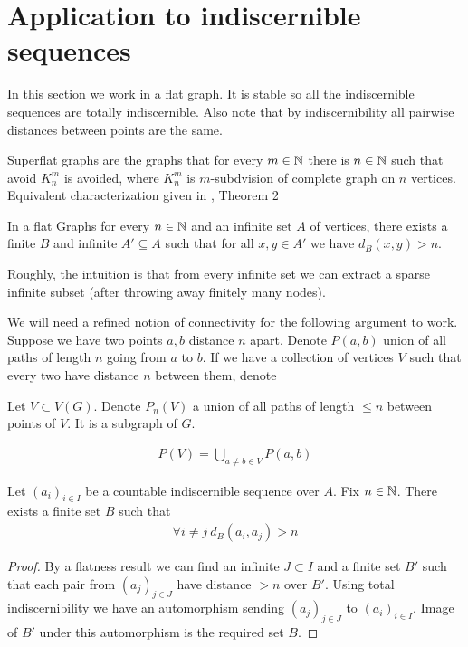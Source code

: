 \documentclass{amsart}
\begin{document}
\section{Application to indiscernible sequences}

In this section we work in a flat graph. It is stable so all the indiscernible sequences are totally indiscernible. Also note that by indiscernibility all pairwise distances between points are the same.

Superflat graphs are the graphs that for every $m \in \mathbb{N}$ there is $n \in \mathbb{N}$ such that avoid $K^m_n$ is avoided, where $K^m_n$ is $m$-subdvision of complete graph on $n$ vertices. Equivalent characterization given in , Theorem 2

\begin{Theorem}
	In a flat Graphs for every $n \in \mathbb{N}$ and an infinite set $A$ of vertices, there exists a finite $B$ and infinite $A' \subseteq A$ such that for all $x,y \in A'$ we have $d_{B}(x, y) > n$.
\end{Theorem}

Roughly, the intuition is that from every infinite set we can extract a sparse infinite subset (after throwing away finitely many nodes).

We will need a refined notion of connectivity for the following argument to work. Suppose we have two points $a,b$ distance $n$ apart. Denote $P(a,b)$ union of all paths of length $n$ going from $a$ to $b$. If we have a collection of vertices $V$ such that every two have distance $n$ between them, denote

Let $V \subset V(G)$. Denote $P_n(V)$ a union of all paths of length $\leq n$ between points of $V$. It is a subgraph of $G$.

\begin{align*}
	P(V) = \bigcup_{a \neq b \in V} P(a,b)
\end{align*}

\begin{Lemma}
	Let $(a_i)_{i \in I}$ be a countable indiscernible sequence over $A$. Fix $n \in \mathbb{N}$. There exists a finite set $B$ such that
	\begin{align*}
		\forall i \neq j \ d_B(a_i, a_j) > n
	\end{align*}
\end{Lemma}

\begin{proof}
	By a flatness result we can find an infinite $J \subset I$ and a finite set $B'$ such that each pair from $(a_j)_{j \in J}$ have distance $>n$ over $B'$. Using total indiscernibility we have an automorphism sending $(a_j)_{j \in J}$ to $(a_i)_{i \in I}$. Image of $B'$ under this automorphism is the required set $B$.
\end{proof}
\end{document}
